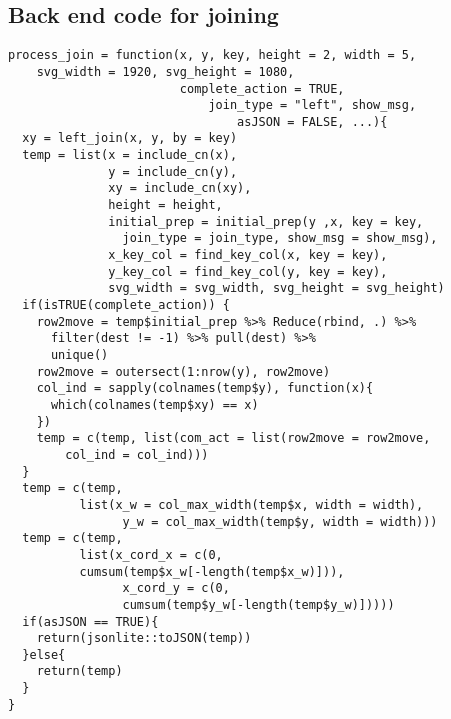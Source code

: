\subsection{Back end code for joining}

\begin{lstlisting}
process_join = function(x, y, key, height = 2, width = 5, 
    svg_width = 1920, svg_height = 1080,
                        complete_action = TRUE, 
                            join_type = "left", show_msg, 
                                asJSON = FALSE, ...){
  xy = left_join(x, y, by = key)
  temp = list(x = include_cn(x),
              y = include_cn(y),
              xy = include_cn(xy),
              height = height,
              initial_prep = initial_prep(y ,x, key = key, 
                join_type = join_type, show_msg = show_msg),
              x_key_col = find_key_col(x, key = key),
              y_key_col = find_key_col(y, key = key),
              svg_width = svg_width, svg_height = svg_height)
  if(isTRUE(complete_action)) {
    row2move = temp$initial_prep %>% Reduce(rbind, .) %>%
      filter(dest != -1) %>% pull(dest) %>%
      unique()
    row2move = outersect(1:nrow(y), row2move)
    col_ind = sapply(colnames(temp$y), function(x){
      which(colnames(temp$xy) == x)
    })
    temp = c(temp, list(com_act = list(row2move = row2move, 
        col_ind = col_ind)))
  }
  temp = c(temp,
          list(x_w = col_max_width(temp$x, width = width),
                y_w = col_max_width(temp$y, width = width)))
  temp = c(temp,
          list(x_cord_x = c(0, 
          cumsum(temp$x_w[-length(temp$x_w)])),
                x_cord_y = c(0, 
                cumsum(temp$y_w[-length(temp$y_w)]))))
  if(asJSON == TRUE){
    return(jsonlite::toJSON(temp))
  }else{
    return(temp)
  }
}

\end{lstlisting}

